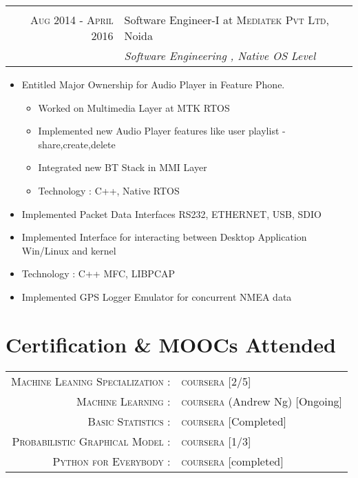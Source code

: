 \documentclass[a4paper,10pt]{article}
\begin{document}
\begin{tabular}{r|p{13cm}}
\multicolumn{2}{c}{} \\
 \textsc{Aug 2014 - April 2016} & Software Engineer-I at \textsc{Mediatek Pvt Ltd}, Noida \\&\emph{Software Engineering , Native OS Level}\\
\end{tabular}
\begin{itemize}
\item Entitled Major Ownership for Audio Player in Feature Phone.
\begin{itemize}
			\item Worked on Multimedia Layer at MTK RTOS 
			\item Implemented new Audio Player features like user playlist - {share,create,delete}
			\item Integrated new BT Stack in MMI Layer
			\item {Technology : C++, Native RTOS}
\end{itemize}
\item Implemented Packet Data Interfaces \textsc{RS232, ETHERNET, USB, SDIO}
\item Implemented Interface for interacting between Desktop Application {Win/Linux} and kernel 
			\item {Technology : C++ MFC, LIBPCAP}
\item Implemented GPS Logger Emulator for concurrent \textsc{NMEA} data
\end{itemize}

\section{Certification \& MOOC\textquotesingle s Attended}
\begin{tabular}{rl}

\textsc{Machine Leaning Specialization :} & \textsc{coursera} [2/5]\\
\textsc{Machine Learning :} & \textsc{coursera} (\small Andrew Ng) [Ongoing]\\
\textsc{Basic Statistics :} & \textsc{coursera} [Completed]\\
\textsc{Probabilistic Graphical Model :} & \textsc{coursera} [1/3] \\
\textsc{Python for Everybody :} & \textsc{coursera} [completed] \\

\end{tabular}
\end{document}

